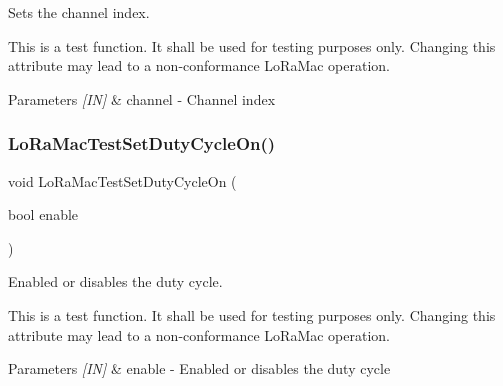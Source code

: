 Sets the channel index. 

This is a test function. It shall be used for testing purposes only. Changing this attribute may lead to a non-\/conformance Lo\+Ra\+Mac operation.


\begin{DoxyParams}{Parameters}
{\em \mbox{[}\+I\+N\mbox{]}} & channel -\/ Channel index \\
\hline
\end{DoxyParams}
\mbox{\label{group__LORAMACTEST_gacee5e0492e548af9e1ec5a995e460865}} 
\subsubsection{\texorpdfstring{Lo\+Ra\+Mac\+Test\+Set\+Duty\+Cycle\+On()}{LoRaMacTestSetDutyCycleOn()}}
{\footnotesize\ttfamily void Lo\+Ra\+Mac\+Test\+Set\+Duty\+Cycle\+On (\begin{DoxyParamCaption}\item[{bool}]{enable }\end{DoxyParamCaption})}



Enabled or disables the duty cycle. 

This is a test function. It shall be used for testing purposes only. Changing this attribute may lead to a non-\/conformance Lo\+Ra\+Mac operation.


\begin{DoxyParams}{Parameters}
{\em \mbox{[}\+I\+N\mbox{]}} & enable -\/ Enabled or disables the duty cycle \\
\hline
\end{DoxyParams}
\mbox{\label{group__LORAMACTEST_ga191314e00a8a27f426427473ba6821a7}} 
